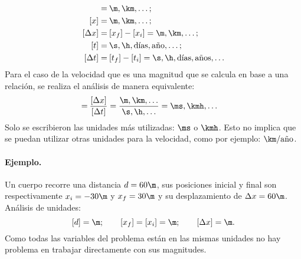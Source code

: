 \begin{align*}
  [d] = &\: \m,\km,\ldots; \\
  [x] = &\: \m,\km,\ldots; \\
  [\Delta x] = &\: [x_f] - [x_i] = \m, \km, \ldots; \\
  [t] = &\: \s, \h, \text{días},\mathrm{a\tilde{n}o},\ldots; \\
  [\Delta t] =  &\: [t_f] - [t_i] = \s, \h, \text{días},\text{años},\ldots
\end{align*}
Para el caso de la velocidad que es una magnitud que se calcula en base a una
relación, se realiza el análisis de manera equivalente:
\begin{align*}
  [v] = &\: \dfrac{[\Delta x]}{[\Delta t]} = \dfrac{\m,\km,\ldots}{\s,
  \h,\ldots} = \ms, \kmh, \ldots 
\end{align*}
Solo se escribieron las unidades más utilizadas: $\ms$ o $\kmh$. Esto no implica
que se puedan utilizar otras unidades para la velocidad, como por ejemplo:
$\km/\mathrm{a\tilde{n}o}$.

\paragraph{Ejemplo.}
Un cuerpo recorre una distancia $d=60\m$, sus posiciones inicial y final son
respectivamente $x_i=-30\m$ y $x_f=30\m$ y su desplazamiento de $\Delta x=60\m$.
Análisis de unidades:
$$
  [d] =  \m; \qquad
  [x_f] = [x_i] =  \m; \qquad
  [\Delta x] = \m. 
$$
Como todas las variables del problema están en las mismas unidades no hay
problema en trabajar directamente con sus magnitudes.
\finej

